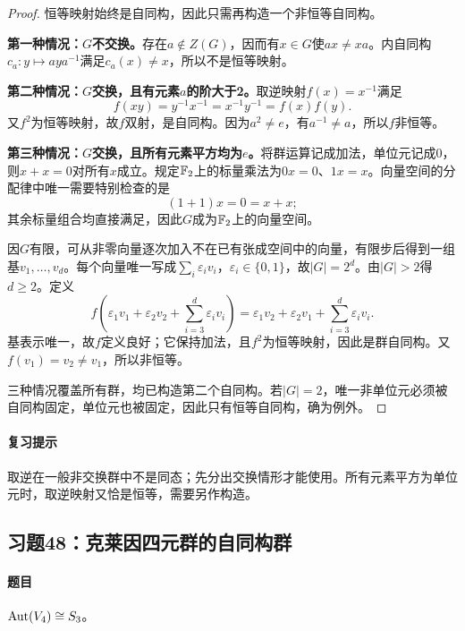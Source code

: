 
\begin{proof}
恒等映射始终是自同构，因此只需再构造一个非恒等自同构。

\textbf{第一种情况：$G$不交换。}存在$a\notin Z(G)$，因而有$x\in G$使$ax\ne xa$。内自同构$c_a:y\mapsto aya^{-1}$满足$c_a(x)\ne x$，所以不是恒等映射。

\textbf{第二种情况：$G$交换，且有元素$a$的阶大于2。}取逆映射$f(x)=x^{-1}$满足
\[
f(xy)=y^{-1}x^{-1}=x^{-1}y^{-1}=f(x)f(y).
\]
又$f^2$为恒等映射，故$f$双射，是自同构。因为$a^2\ne e$，有$a^{-1}\ne a$，所以$f$非恒等。

\textbf{第三种情况：$G$交换，且所有元素平方均为$e$。}将群运算记成加法，单位元记成0，则$x+x=0$对所有$x$成立。规定$\mathbb F_2$上的标量乘法为$0x=0$、$1x=x$。向量空间的分配律中唯一需要特别检查的是
\[
(1+1)x=0=x+x;
\]
其余标量组合均直接满足，因此$G$成为$\mathbb F_2$上的向量空间。

因$G$有限，可从非零向量逐次加入不在已有张成空间中的向量，有限步后得到一组基$v_1,\ldots,v_d$。每个向量唯一写成$\sum_i\varepsilon_iv_i$，$\varepsilon_i\in\{0,1\}$，故$|G|=2^d$。由$|G|>2$得$d\ge2$。定义
\[
f\left(\varepsilon_1v_1+\varepsilon_2v_2+\sum_{i=3}^d\varepsilon_iv_i\right)
=\varepsilon_1v_2+\varepsilon_2v_1+\sum_{i=3}^d\varepsilon_iv_i.
\]
基表示唯一，故$f$定义良好；它保持加法，且$f^2$为恒等映射，因此是群自同构。又$f(v_1)=v_2\ne v_1$，所以非恒等。

三种情况覆盖所有群，均已构造第二个自同构。若$|G|=2$，唯一非单位元必须被自同构固定，单位元也被固定，因此只有恒等自同构，确为例外。
\end{proof}

\paragraph{复习提示}
取逆在一般非交换群中不是同态；先分出交换情形才能使用。所有元素平方为单位元时，取逆映射又恰是恒等，需要另作构造。


\subsection{习题48：\texorpdfstring{克莱因四元群的自同构群}{克莱因四元群的自同构群}}
\label{ex:2:48}

\paragraph{题目}
$\operatorname{Aut}(V_4)\cong S_3$。

